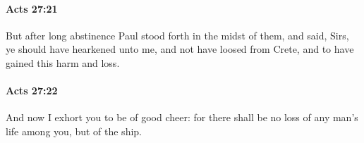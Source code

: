 		\paragraph{Acts 27:21} %
			\label{ACTS-27-21}

			But after long abstinence Paul stood forth in the midst of them, and said, Sirs, ye should have hearkened unto me, and not have loosed from Crete, and to have gained this harm and loss.

			\begin{framed}
			\scriptsize
				\begin{compactdesc}
					\item[SBLG] 
				\end{compactdesc}
			\end{framed}

		\paragraph{Acts 27:22} %
			\label{ACTS-27-22}

			And now I exhort you to be of good cheer: for there shall be no loss of any man's life among you, but of the ship.

